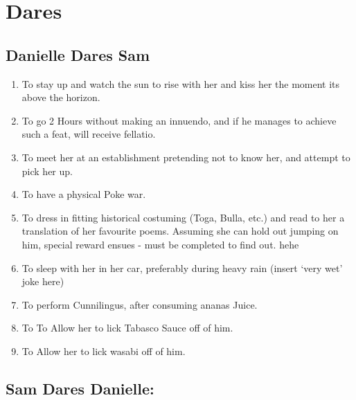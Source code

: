 
 

 \section{Dares}

 \renewcommand{\theenumi}{\thesubsection.\arabic{enumi}}

   \subsection{Danielle Dares Sam}

\begin{enumerate}
\item  To stay up and watch the sun to rise with her and kiss her the moment its above the horizon.

\item  To go 2 Hours without making an innuendo, and if he manages to achieve such a feat, will receive fellatio.

\item  To meet her at an establishment pretending not to know her, and attempt to pick her up.

\item  To have a physical Poke war. 

\item  To dress in fitting historical costuming (Toga, Bulla, etc.) and read to her a translation of her favourite poems.  Assuming she can hold out  jumping on him, special reward ensues - must be completed to find out.  hehe 

\item  To sleep with her in her car, preferably during heavy rain (insert `very wet' joke here) 

\item To perform Cunnilingus, after consuming ananas Juice.

\item To To Allow her to lick Tabasco Sauce off of him.

\item To Allow her to lick wasabi off of him.

\end{enumerate}

 

  \subsection{Sam Dares Danielle:}

